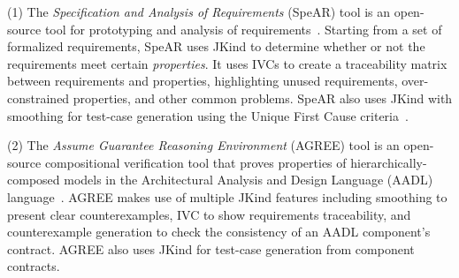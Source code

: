 \documentclass{llncs}
\newcommand{\jkind}{{\sc JKind}\xspace}
\newcommand{\lustre}{{\sc Lustre}\xspace}
\newcommand{\spear}{{\sc SpeAR}\xspace}
\newcommand{\agree}{{\sc AGREE}\xspace}
\renewcommand{\paragraph}[1]{\vspace{5pt}\noindent {\bf #1}}
\newcommand{\application}[2]{
  \paragraph{#1} \hfill {\it #2}
  \vspace{1pt}
}
\begin{document}
(1) The {\em Specification and Analysis of Requirements} (\spear) tool is an open-source tool for prototyping and analysis of requirements~\cite{fifarek2017nfm}.  Starting from a set of formalized requirements, \spear uses \jkind to determine whether or not the requirements meet certain {\em properties}.  It uses IVCs to create a traceability matrix between requirements and properties, highlighting unused requirements, over-constrained properties, and other common problems. \spear also uses \jkind with smoothing for test-case generation using the Unique First Cause criteria~\cite{whalen2006issta}.
%
%

(2) The {\em Assume Guarantee Reasoning Environment} (\agree) tool is
an open-source compositional verification tool that proves properties
of hierarchically-composed models in the Architectural Analysis and
Design Language (AADL) language~\cite{cofer2012nfm,QFCS15:backes,hilt2013}.
%
%
%
\agree makes use of multiple \jkind features including smoothing to
present clear counterexamples, IVC to show requirements traceability,
and counterexample generation to check the consistency of an AADL
component's contract. \agree also uses \jkind for test-case generation
from component contracts.
\end{document}
